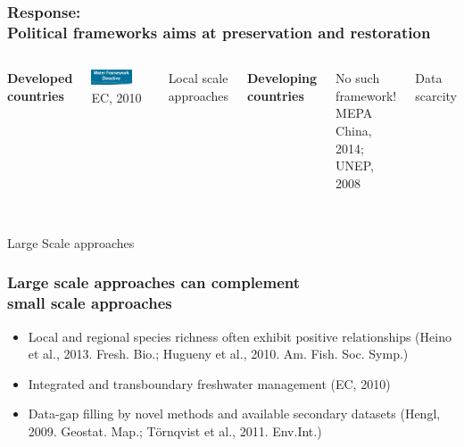 \documentclass[10pt, compress]{beamer}
\begin{document}
\begin{frame}[fragile]
  \frametitle{Response:\protect\\Political frameworks aims at preservation and restoration}
  \begin{columns}
  \column{5cm}
   \centering \textbf{Developed countries}\\
  \vspace{10pt}
   {\includegraphics[width=0.7\textwidth]{images/WFD.png}\\
     \hspace{2cm} \footnotesize EC, 2010\\ \normalsize
     \medskip
     \raggedright \alert{Local scale approaches}}
  \column{5cm}
   \centering \textbf{Developing countries}\\
  \vspace{16pt}
   {\Large{\alert{No such framework!}} \\
     \hspace{1cm} \footnotesize MEPA China, 2014; UNEP, 2008\\ \normalsize
     \vspace{20pt}
     \raggedright \alert{Data scarcity}}
  \end{columns}\\
  \vspace{15pt}
   \hspace{2cm} \LARGE \alert{Large Scale approaches}
\end{frame}


\begin{frame}[fragile]
  \frametitle{Large scale approaches can complement \protect\\ small scale approaches}
  \begin{itemize}
  \item Local and regional species richness often exhibit positive relationships \footnotesize (Heino et al., 2013. Fresh. Bio.; Hugueny et al., 2010. Am. Fish. Soc. Symp.) \normalsize
  \smallskip
  \pause
  \item Integrated and transboundary freshwater management \footnotesize (EC, 2010) \normalsize
  \smallskip
  \pause
  \item Data-gap filling by novel methods and available secondary datasets \footnotesize (Hengl, 2009. Geostat. Map.; Törnqvist et al., 2011. Env.Int.) \normalsize
  \end{itemize}
\end{frame}
\end{document}
